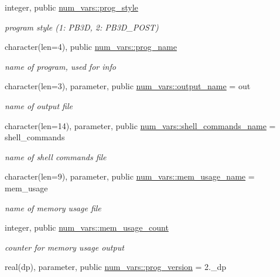 \begin{DoxyCompactItemize}
integer, public \hyperlink{namespacenum__vars_a50245a345efb453eda46b3fe98b702e8}{num\+\_\+vars\+::prog\+\_\+style}
\begin{DoxyCompactList}\small\item\em program style (1\+: P\+B3D, 2\+: P\+B3\+D\+\_\+\+P\+O\+ST) \end{DoxyCompactList}\item 
character(len=4), public \hyperlink{namespacenum__vars_a7548fedc0d8f3102844aded2e6c11f82}{num\+\_\+vars\+::prog\+\_\+name}
\begin{DoxyCompactList}\small\item\em name of program, used for info \end{DoxyCompactList}\item 
character(len=3), parameter, public \hyperlink{namespacenum__vars_a0fbc4b8f8965e85d6cb1b1f7894ab698}{num\+\_\+vars\+::output\+\_\+name} = \textquotesingle{}out\textquotesingle{}
\begin{DoxyCompactList}\small\item\em name of output file \end{DoxyCompactList}\item 
character(len=14), parameter, public \hyperlink{namespacenum__vars_af30710083de41ebf93a407412d3125e5}{num\+\_\+vars\+::shell\+\_\+commands\+\_\+name} = \textquotesingle{}shell\+\_\+commands\textquotesingle{}
\begin{DoxyCompactList}\small\item\em name of shell commands file \end{DoxyCompactList}\item 
character(len=9), parameter, public \hyperlink{namespacenum__vars_a88d78503df095a1c19b851caf2d889ba}{num\+\_\+vars\+::mem\+\_\+usage\+\_\+name} = \textquotesingle{}mem\+\_\+usage\textquotesingle{}
\begin{DoxyCompactList}\small\item\em name of memory usage file \end{DoxyCompactList}\item 
integer, public \hyperlink{namespacenum__vars_a7f93ac44620a69373a76d591fa8507a2}{num\+\_\+vars\+::mem\+\_\+usage\+\_\+count}
\begin{DoxyCompactList}\small\item\em counter for memory usage output \end{DoxyCompactList}\item 
real(dp), parameter, public \hyperlink{namespacenum__vars_a7ab03bffd054a230cad4b7e2c130def1}{num\+\_\+vars\+::prog\+\_\+version} = 2.\+\_\+dp

\end{DoxyCompactItemize}
